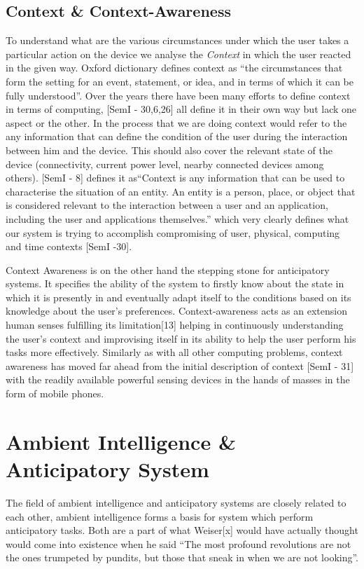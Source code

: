 \documentclass[12pt]{report}
\begin{document}
\section{Context \& Context-Awareness}
To understand what are the various circumstances under which the user takes a particular action on the device we analyse the \textit{Context} in which the user reacted in the given way. Oxford dictionary defines context as ``the circumstances that form the setting for an event, statement, or idea, and in terms of which it can be fully understood''. Over the years there have been many efforts to define context in terms of computing, [SemI - 30,6,26] all define it in their own way but lack one aspect or the other. In the process that we are doing context would refer to the any information that can define the condition of the user during the interaction between him and the device. This should also cover the relevant state of the device (connectivity, current power level, nearby connected devices among others). [SemI - 8] defines it as``Context is any information that can be used to characterise the situation of an entity. An entity is a person, place, or object that is considered relevant to the interaction between a user and an application, including the user and applications themselves.'' which very clearly defines what our system is trying to accomplish compromising of user, physical, computing and time contexts [SemI -30].

Context Awareness is on the other hand the stepping stone for anticipatory systems. It specifies the ability of the system to firstly know about the state in which it is presently in and eventually adapt itself to the conditions based on its knowledge about the user's preferences. Context-awareness acts as an extension human senses fulfilling its limitation[13] helping in continuously understanding the user's context and improvising itself in its ability to help the user perform his tasks more effectively. Similarly as with all other computing problems, context awareness has moved far ahead from the initial description of context [SemI - 31] with the readily available powerful sensing devices in the hands of masses in the form of mobile phones.


\chapter{Ambient Intelligence \& Anticipatory System}

The field of ambient intelligence and anticipatory systems are closely related to each other, ambient intelligence forms a basis for system which perform anticipatory tasks. Both are a part of what Weiser[x] would have actually thought would come into existence when he said ``The most profound revolutions are not the ones trumpeted by pundits, but those that sneak in when we are not looking''.
\end{document}
